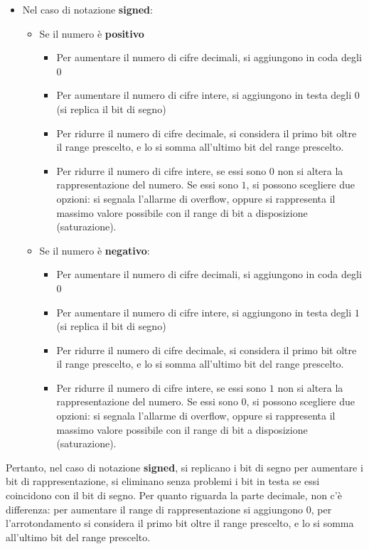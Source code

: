 \documentclass[a4paper]{extarticle}
\begin{document}
\begin{itemize}
    \item Nel caso di notazione \textbf{signed}:
    \begin{itemize}
        \item Se il numero è \textbf{positivo}
        \begin{itemize}
            \item Per aumentare il numero di cifre decimali, si aggiungono in coda degli $0$
            \item Per aumentare il numero di cifre intere, si aggiungono in testa degli $0$ (si replica il bit di segno)
            \item Per ridurre il numero di cifre decimale, si considera il primo bit oltre il range prescelto, e lo si somma all'ultimo bit del range prescelto.
            \item Per ridurre il numero di cifre intere, se essi sono $0$ non si altera la rappresentazione del numero. Se essi sono $1$, si possono scegliere due opzioni: si segnala l'allarme di overflow, oppure si rappresenta il massimo valore possibile con il range di bit a disposizione (saturazione). 
        \end{itemize}
        \item Se il numero è \textbf{negativo}:
        \begin{itemize}
            \item Per aumentare il numero di cifre decimali, si aggiungono in coda degli $0$
            \item Per aumentare il numero di cifre intere, si aggiungono in testa degli $1$ (si replica il bit di segno)
            \item Per ridurre il numero di cifre decimale, si considera il primo bit oltre il range prescelto, e lo si somma all'ultimo bit del range prescelto.
            \item Per ridurre il numero di cifre intere, se essi sono $1$ non si altera la rappresentazione del numero. Se essi sono $0$, si possono scegliere due opzioni: si segnala l'allarme di overflow, oppure si rappresenta il massimo valore possibile con il range di bit a disposizione (saturazione).
        \end{itemize}
    \end{itemize}
\end{itemize}
Pertanto, nel caso di notazione \textbf{signed}, si replicano i bit di segno per aumentare i bit di rappresentazione, si eliminano senza problemi i bit in testa se essi coincidono con il bit di segno. Per quanto riguarda la parte decimale, non c'è differenza: per aumentare il range di rappresentazione si aggiungono $0$, per l'arrotondamento si considera il primo bit oltre il range prescelto, e lo si somma all'ultimo bit del range prescelto.
\end{document}
